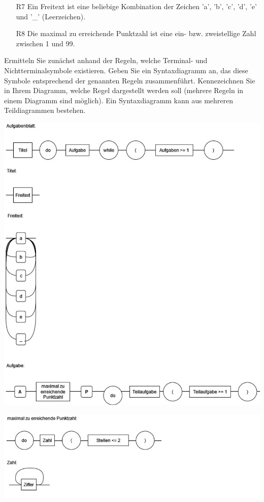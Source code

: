 \begin{itemize}
\begin{itemize}
  \item [R7] Ein Freitext ist eine beliebige Kombination der Zeichen 'a', 'b', 'c', 'd', 'e' und '\_' (Leerzeichen).
  
  \item [R8] Die maximal zu erreichende Punktzahl ist eine ein- bzw. zweistellige Zahl zwischen 1 und 99.

\end{itemize}
    
  Ermitteln Sie zunächst anhand der Regeln, welche Terminal- und Nichtterminalsymbole existieren. Geben Sie ein Syntaxdiagramm an, das diese Symbole entsprechend der genannten Regeln zusammenführt. Kennezeichnen Sie in Ihrem Diagramm, welche Regel dargestellt werden soll (mehrere Regeln in einem Diagramm sind möglich). Ein Syntaxdiagramm kann aus mehreren Teildiagrammen bestehen.

  \begin{center}
    \includegraphics[width=15 cm]{syntax1.jpg}
  \end{center}

  \begin{center}
    \includegraphics[width=15 cm]{syntax2.jpg}
  \end{center}


\end{itemize}

